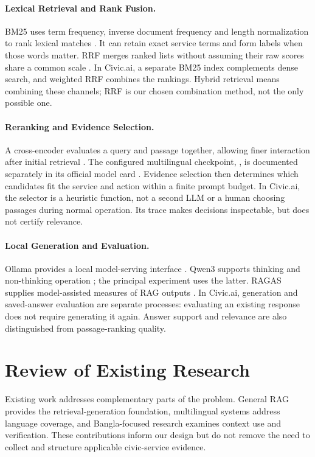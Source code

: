 \paragraph{Lexical Retrieval and Rank Fusion.}
BM25 uses term frequency, inverse document frequency and length normalization to rank lexical matches \cite{bm25}. It can retain exact service terms and form labels when those words matter. RRF merges ranked lists without assuming their raw scores share a common scale \cite{rrf}. In Civic.ai, a separate BM25 index complements dense search, and weighted RRF combines the rankings. Hybrid retrieval means combining these channels; RRF is our chosen combination method, not the only possible one.

\paragraph{Reranking and Evidence Selection.}
A cross-encoder evaluates a query and passage together, allowing finer interaction after initial retrieval \cite{bert_reranking}. The configured multilingual checkpoint, , is documented separately in its official model card \cite{bge_checkpoint}. Evidence selection then determines which candidates fit the service and action within a finite prompt budget. In Civic.ai, the selector is a heuristic function, not a second LLM or a human choosing passages during normal operation. Its trace makes decisions inspectable, but does not certify relevance.

\paragraph{Local Generation and Evaluation.}
Ollama provides a local model-serving interface \cite{ollama_docs}. Qwen3 supports thinking and non-thinking operation \cite{qwen3}; the principal experiment uses the latter. RAGAS supplies model-assisted measures of RAG outputs \cite{ragas}. In Civic.ai, generation and saved-answer evaluation are separate processes: evaluating an existing response does not require generating it again. Answer support and relevance are also distinguished from passage-ranking quality.

\section{Review of Existing Research}
Existing work addresses complementary parts of the problem. General RAG provides the retrieval-generation foundation, multilingual systems address language coverage, and Bangla-focused research examines context use and verification. These contributions inform our design but do not remove the need to collect and structure applicable civic-service evidence.

